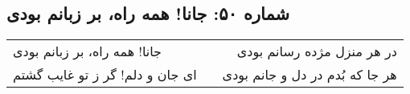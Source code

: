 \begin{center}
\section*{شماره ۵۰: جانا! همه راه، بر زبانم بودی}
\label{sec:050}
\begin{longtable}{l p{0.5cm} r}
جانا! همه راه، بر زبانم بودی
&&
در هر منزل مژده رسانم بودی
\\
ای جان و دلم! گر ز تو غایب گشتم
&&
هر جا که بُدم در دل و جانم بودی
\\
\end{longtable}
\end{center}

